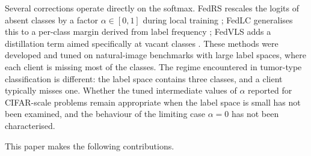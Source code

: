 \documentclass[journal]{IEEEtran}
\begin{document}
Several corrections operate directly on the softmax. FedRS rescales the logits
of absent classes by a factor $\alpha \in [0,1]$ during local training
\cite{fedrs2021}; FedLC generalises this to a per-class margin derived from
label frequency \cite{fedlc2022}; FedVLS adds a distillation term aimed
specifically at vacant classes \cite{fedvls2025}. These methods were developed
and tuned on natural-image benchmarks with large label spaces, where each client
is missing most of the classes. The regime encountered in tumor-type
classification is different: the label space contains three classes, and a
client typically misses one. Whether the tuned intermediate values of $\alpha$
reported for CIFAR-scale problems remain appropriate when the label space is
small has not been examined, and the behaviour of the limiting case
$\alpha = 0$ has not been characterised.

This paper makes the following contributions.
\end{document}

